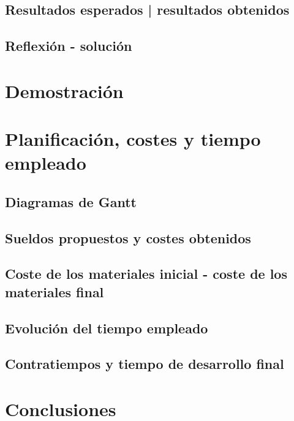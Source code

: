 \section{Resultados esperados | resultados obtenidos}

\section{Reflexión - solución}


\chapter{Demostración}

\chapter{Planificación, costes y tiempo empleado}

\section{Diagramas de Gantt}

\section{Sueldos propuestos y costes obtenidos}

\section{Coste de los materiales inicial - coste de los materiales final}

\section{Evolución del tiempo empleado}

\section{Contratiempos y tiempo de desarrollo final}


\chapter{Conclusiones}

